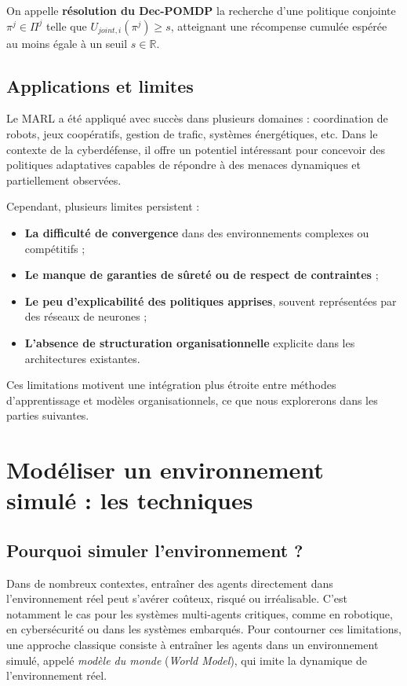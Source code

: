 On appelle \textbf{résolution du \ac{Dec-POMDP}} la recherche d'une politique conjointe $\pi^j \in \Pi^j$ telle que $U_{joint,i}(\pi^j) \geq s$, atteignant une récompense cumulée espérée au moins égale à un seuil $s \in \mathbb{R}$.


\subsection{Applications et limites}

Le \ac{MARL} a été appliqué avec succès dans plusieurs domaines : coordination de robots, jeux coopératifs, gestion de trafic, systèmes énergétiques, etc. Dans le contexte de la cyberdéfense, il offre un potentiel intéressant pour concevoir des politiques adaptatives capables de répondre à des menaces dynamiques et partiellement observées.

Cependant, plusieurs limites persistent :
\begin{itemize}
    \item \textbf{La difficulté de convergence} dans des environnements complexes ou compétitifs ;
    \item \textbf{Le manque de garanties de sûreté ou de respect de contraintes} ;
    \item \textbf{Le peu d'explicabilité des politiques apprises}, souvent représentées par des réseaux de neurones ;
    \item \textbf{L'absence de structuration organisationnelle} explicite dans les architectures existantes.
\end{itemize}

Ces limitations motivent une intégration plus étroite entre méthodes d'apprentissage et modèles organisationnels, ce que nous explorerons dans les parties suivantes.


\section{Modéliser un environnement simulé : les techniques }


\subsection{Pourquoi simuler l'environnement ?}

Dans de nombreux contextes, entraîner des agents directement dans l'environnement réel peut s'avérer coûteux, risqué ou irréalisable. C'est notamment le cas pour les systèmes multi-agents critiques, comme en robotique, en cybersécurité ou dans les systèmes embarqués. Pour contourner ces limitations, une approche classique consiste à entraîner les agents dans un environnement simulé, appelé \textit{modèle du monde} (\textit{World Model}), qui imite la dynamique de l'environnement réel.

